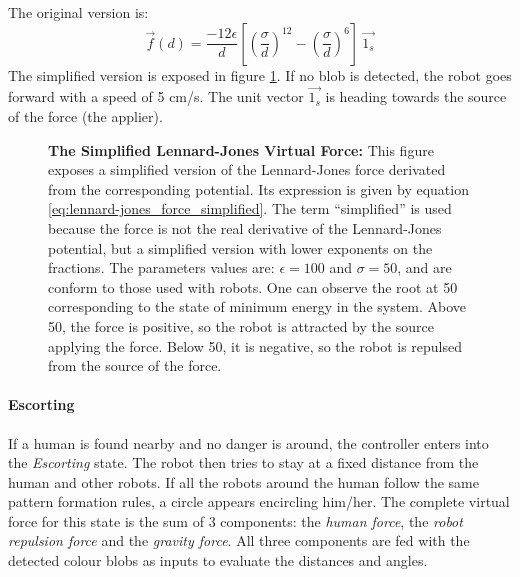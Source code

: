 \documentclass[oneside, a4paper, 12pt]{memoir}
\let\oldCaption\caption
\renewcommand{\caption}[2]{
\oldCaption[#1]{{\small\sffamily\bfseries #1:} #2}
}
\begin{document}
				The original version is:
				\begin{equation}
					\vec{f}(d) = \frac{-12\epsilon}{d} \left[ \left(\frac{\sigma}{d}\right)^{12} - \left(\frac{\sigma}{d}\right)^6 \right] ~\vec{1_s}
				\end{equation}
				 The simplified version is exposed in figure \ref{fig:lennard-jones_force_simplified}. If no blob is detected, the robot goes forward with a speed of 5 cm/s. The unit vector $\vec{1_s}$ is heading towards the source of the force (the applier).
				
				\begin{figure}\centering
					
					\caption{The Simplified Lennard-Jones Virtual Force}{This figure exposes a simplified version of the Lennard-Jones force derivated from the corresponding potential. Its expression is given by equation \ref{eq:lennard-jones_force_simplified}. The term \enquote{simplified} is used because the force is not the real derivative of the Lennard-Jones potential, but a simplified version with lower exponents on the fractions. The parameters values are: $\epsilon=100$ and $\sigma=50$, and are conform to those used with robots. One can observe the root at 50 corresponding to the state of minimum energy in the system. Above 50, the force is positive, so the robot is attracted by the source applying the force. Below 50, it is negative, so the robot is repulsed from the source of the force.}
					\label{fig:lennard-jones_force_simplified}
				\end{figure}
			
			\paragraph{Escorting}
			
			If a human is found nearby and no danger is around, the controller enters into the \emph{Escorting} state. The robot then tries to stay at a fixed distance from the human and other robots. If all the robots around the human follow the same pattern formation rules, a circle appears encircling him/her. The complete virtual force for this state is the sum of 3 components: the \emph{human force}, the \emph{robot repulsion force} and the \emph{gravity force}. All three components are fed with the detected colour blobs as inputs to evaluate the distances and angles.
			
\end{document}
